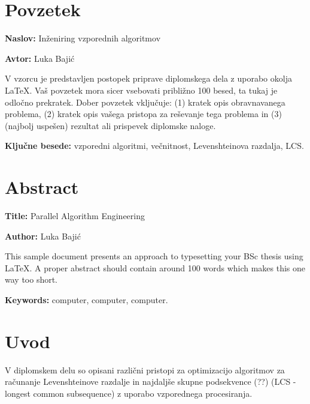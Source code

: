 \documentclass[a4paper,12pt,openright]{book}
\newcommand{\ttitle}{Inženiring vzporednih algoritmov}
\newcommand{\ttitleEn}{Parallel Algorithm Engineering}
\newcommand{\tauthor}{Luka Bajić}
\newcommand{\tkeywords}{vzporedni algoritmi, večnitnost, Levenshteinova razdalja, LCS}
\newcommand{\tkeywordsEn}{computer, computer, computer}
\newcommand{\clearemptydoublepage}{\newpage{\pagestyle{empty}\cleardoublepage}}
\begin{document}
\clearemptydoublepage

{}
\chapter*{Povzetek}

\noindent\textbf{Naslov:} \ttitle
\bigskip

\noindent\textbf{Avtor:} \tauthor
\bigskip

\noindent V vzorcu je predstavljen postopek priprave diplomskega dela z uporabo okolja \LaTeX. Vaš povzetek mora sicer vsebovati približno 100 besed, ta tukaj je odločno prekratek.
Dober povzetek vključuje: (1) kratek opis obravnavanega problema, (2) kratek opis vašega pristopa za reševanje tega problema in (3) (najbolj uspešen) rezultat ali prispevek diplomske naloge.

\bigskip

\noindent\textbf{Ključne besede:} \tkeywords.
\clearemptydoublepage

{}
\chapter*{Abstract}

\noindent\textbf{Title:} \ttitleEn
\bigskip

\noindent\textbf{Author:} \tauthor
\bigskip

\noindent This sample document presents an approach to typesetting your BSc thesis using \LaTeX. 
A proper abstract should contain around 100 words which makes this one way too short.
\bigskip

\noindent\textbf{Keywords:} \tkeywordsEn.
\clearemptydoublepage

\mainmatter
\setcounter{page}{1}
\pagestyle{fancy}

\chapter{Uvod}

V diplomskem delu so opisani različni pristopi za optimizacijo algoritmov za računanje Levenshteinove razdalje in najdaljše skupne podsekvence (??) (LCS - longest common subsequence) z uporabo vzporednega procesiranja. 
\end{document}
